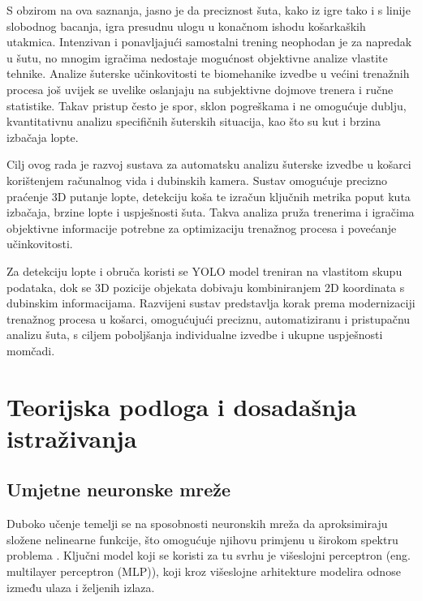\documentclass[zavrsnirad]{fer}
\begin{document}
S obzirom na ova saznanja, jasno je da preciznost šuta, kako iz igre tako i s linije slobodnog bacanja, igra presudnu ulogu u konačnom ishodu košarkaških utakmica. 
Intenzivan i ponavljajući samostalni trening neophodan je za napredak u šutu, no mnogim igračima nedostaje mogućnost objektivne analize vlastite tehnike.
Analize šuterske učinkovitosti te biomehanike izvedbe u većini trenažnih procesa još uvijek se uvelike oslanjaju na subjektivne dojmove trenera i ručne statistike.  
Takav pristup često je spor, sklon pogreškama i ne omogućuje dublju, kvantitativnu analizu specifičnih šuterskih situacija, kao što su kut i brzina izbačaja lopte.

Cilj ovog rada je razvoj sustava za automatsku analizu šuterske izvedbe u košarci korištenjem računalnog vida i dubinskih kamera. 
Sustav omogućuje precizno praćenje 3D putanje lopte, detekciju koša te izračun ključnih metrika poput kuta izbačaja, brzine lopte i uspješnosti šuta. 
Takva analiza pruža trenerima i igračima objektivne informacije potrebne za optimizaciju trenažnog procesa i povećanje učinkovitosti.

Za detekciju lopte i obruča koristi se YOLO model treniran na vlastitom skupu podataka, dok se 3D pozicije objekata dobivaju kombiniranjem 2D koordinata s dubinskim informacijama. 
Razvijeni sustav predstavlja korak prema modernizaciji trenažnog procesa u košarci, omogućujući preciznu, automatiziranu i pristupačnu analizu šuta, s ciljem poboljšanja individualne izvedbe i ukupne uspješnosti momčadi.

\chapter{Teorijska podloga i dosadašnja istraživanja}
\label{pog:teorijska_podloga_i_dosadasnja_istrazivanja}

\section{Umjetne neuronske mreže}
\label{pog:kosarkaska_tehnika_suta}
Duboko učenje temelji se na sposobnosti neuronskih mreža da aproksimiraju složene nelinearne funkcije, što omogućuje njihovu primjenu u širokom spektru problema \cite{Goodfellow-et-al-2016}. 
Ključni model koji se koristi za tu svrhu je višeslojni perceptron (eng. multilayer perceptron (MLP)), koji kroz višeslojne arhitekture modelira odnose između ulaza i željenih izlaza.
\end{document}
